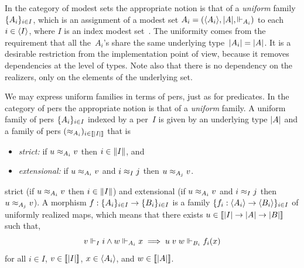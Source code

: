 \iflong
In the category of modest sets the appropriate notion is that of a
\emph{uniform} family~$\{A_i\}_{i \in I}$, which is an assignment
of a modest set $A_i = (\langle A_i \rangle, |A|, {\Vdash_{A_i}})$ to each
$i \in \langle I \rangle$, where $I$ is an index modest
set~\cite[6.3]{JacobsB:cltt}. The uniformity comes from the
requirement that all the~$A_i$'s share the same underlying
type~$|A_i| = |A|$. It is a desirable restriction from
the implementation point of view, because it removes dependencies at
the level of types. Note also that there is no dependency on the
realizers, only on the elements of the underlying set.

We may express uniform families in terms of pers, just as for
predicates.
\else
In the category of pers the appropriate notion is that of a
\emph{uniform} family.
%
\fi
A uniform family of pers $\{A_i\}_{i \in I}$ indexed
by a per~$I$ is given by an underlying type $|A|$ and a family
of pers $(\approx_{A_i})_{i \in [\![|I|]\!]}$ that is
% 
\iflong
\begin{itemize}
\item \emph{strict:} if $u \approx_{A_i} v$ then $i \in \|I\|$, and
\item \emph{extensional:} if $u \approx_{A_i} v$ and $i \approx_I j$ then $u
  \approx_{A_j} v$.
\end{itemize}
\else %
strict (if $u \approx_{A_i} v$ then $i \in \|I\|$) and
extensional (if $u \approx_{A_i} v$ and $i \approx_I j$ then $u
  \approx_{A_j} v$).
\fi %
%
\iflong
A morphism $f : \{A_i\}_{i \in I} \to \{B_i\}_{i \in I}$ is a
family $\{f_i : \langle A_i \rangle \to \langle B_i \rangle\}_{i \in I}$ of
uniformly realized maps, which means that there exists $u \in
[\![|I| \to |A| \to |B|]\!]$ such that,
%
\begin{equation*}
  v \Vdash_I i \land w \Vdash_{A_i} x \implies u\; v \; w \Vdash_{B_i} f_i(x)
\end{equation*}
%
for all $i \in I$, $v \in [\![|I|]\!]$, $x \in \langle A_i \rangle$,
and $w \in [\![|A|]\!]$.
%
\fi


